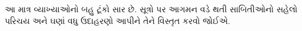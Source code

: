 \documentclass[../../../include/open-logic-chapter]{subfiles}
\begin{document}

\begin{editorial}
  આ માત્ર વ્યાખ્યાઓનો બહુ ટૂંકો સાર છે. સૂત્રો પર આગમન વડે થતી
  સાબિતીઓનો સહેલો પરિચય અને ઘણાં વધુ ઉદાહરણો આપીને તેને વિસ્તૃત
  કરવો જોઈએ.
\end{editorial}







\OLEndChapterHook
\end{document}
